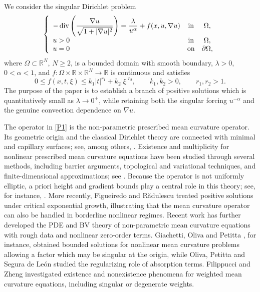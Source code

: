 \documentclass[11pt,leqno]{amsart}
\begin{document}
We consider the singular Dirichlet problem
\begin{equation}\label{P1}
    \left\{
    \begin{array}{lcc}
        -\operatorname{div}\left(
        \dfrac{\nabla u}{\sqrt{1+|\nabla u|^2}}\right)
        =\dfrac{\lambda}{u^\alpha}+f(x,u,\nabla u)
        &\textup{in}&\Omega,\\[1ex]
        u>0&\textup{in}&\Omega,\\
        u=0&\textup{on}&\partial\Omega,
    \end{array}
    \right.
\end{equation}
where $\Omega\subset\mathbb R^N$, $N\ge2$, is a bounded domain with smooth
boundary, $\lambda>0$, $0<\alpha<1$, and
$f:\Omega\times\mathbb R\times\mathbb R^N\to\mathbb R$ is continuous
and satisfies
\begin{equation}\label{f}
0\le f(x,t,\xi)\le k_1|t|^{r_1}+k_2|\xi|^{r_2},
\qquad k_1,k_2>0,\qquad r_1,r_2>1.
\end{equation}
The purpose of the paper is to establish a branch of positive solutions
which is quantitatively small as $\lambda\to0^+$, while retaining both
the singular forcing $u^{-\alpha}$ and the genuine convection dependence
on $\nabla u$.

The operator in \eqref{P1} is the non-parametric prescribed mean
curvature operator. Its geometric origin and the classical Dirichlet
theory are connected with minimal and capillary surfaces; see, among
others, \cite{Finn,Giusti,Serrin,Lopez}. Existence and multiplicity for
nonlinear prescribed mean curvature equations have been studied through
several methods, including barrier arguments, topological and
variational techniques, and finite-dimensional approximations; see
\cite{CoffmanZ,HabetsO,ObersnelO,Lorca1,Le,CGMS}. Because the operator is
not uniformly elliptic, a priori height and gradient bounds play a central
role in this theory; see, for instance,
\cite{Ripoll,Tersenov,Lorca2}. More recently,
Figueiredo and R\u{a}dulescu \cite{FR} treated positive solutions under
critical exponential growth, illustrating that the mean curvature
operator can also be handled in borderline nonlinear regimes. Recent
work has further developed the PDE and BV theory of non-parametric mean
curvature equations with rough data and nonlinear zero-order terms.
Giachetti, Oliva and Petitta \cite{GOP2024}, for instance, obtained
bounded solutions for nonlinear mean curvature problems allowing a
factor which may be singular at the origin, while Oliva, Petitta and
Segura de Le\'on \cite{OPS2024} studied the regularizing role of
absorption terms. Filippucci and Zheng \cite{FZ2024} investigated
existence and nonexistence phenomena for weighted mean curvature
equations, including singular or degenerate weights.
\end{document}
